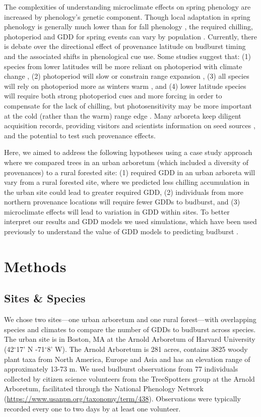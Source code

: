 \documentclass{article}\usepackage[]{graphicx}\usepackage[]{color}
\begin{document}
The complexities of understanding microclimate effects on spring phenology are increased by phenology's genetic component. Though local adaptation in spring phenology is generally much lower than for fall phenology \citep{McKown2013, Aitken2015, Vico2021}, the required chilling, photoperiod and GDD for spring events can vary by population \citep{Scotti2004,Cuervo-Alarcon2018}. Currently, there is debate over the directional effect of provenance latitude on budburst timing and the associated shifts in phenological cue use. Some studies suggest that: (1) species from lower latitudes will be more reliant on photoperiod with climate change \citep{Zohner2016}, (2) photoperiod will slow or constrain range expansion \citep{Saikkonen2012}, (3) all species will rely on photoperiod more as winters warm \citep{Way2015}, and (4) lower latitude species will require both strong photoperiod cues and more forcing in order to compensate for the lack of chilling, but photosensitivity may be more important at the cold (rather than the warm) range edge \citep{Gauzere2017}. Many arboreta keep diligent acquisition records, providing visitors and scientists information on seed sources \citep{Dosmann2006}, and the potential to test such provenance effects. 

Here, we aimed to address the following hypotheses using a case study approach where we compared trees in an urban arboretum (which included a diversity of provenances) to a rural forested site: (1) required GDD in an urban arboreta will vary from a rural forested site, where we predicted less chilling accumulation in the urban site could lead to greater required GDD, (2) individuals from more northern provenance locations will require fewer GDDs to budburst, and (3) microclimate effects will lead to variation in GDD within sites. To better interpret our results and GDD models we used simulations, which have been used previously to understand the value of GDD models to predicting budburst \citep[e.g.,][]{Hunter1992}.

\section*{Methods}
\subsection*{Sites \& Species}
We chose two sites---one urban arboretum and one rural forest---with overlapping species and climates to compare the number of GDDs to budburst across species. The urban site is in Boston, MA at the Arnold Arboretum of Harvard University (42$^{\circ}$17' N -71$^{\circ}$8' W). The Arnold Arboretum is 281 acres, contains 3825 woody plant taxa from North America, Europe and Asia and has an elevation range of approximately 13-73 m. We used budburst observations \citep[i.e., defined as the `beginning of sprouting or bud breaking; shoot emergence' as BBCH scale 07][]{Finn2007} from 77 individuals collected by citizen science volunteers from the TreeSpotters group at the Arnold Arboretum, facilitated through the National Phenology Network (\url{https://www.usanpn.org/taxonomy/term/438}). Observations were typically recorded every one to two days by at least one volunteer.
\end{document}

